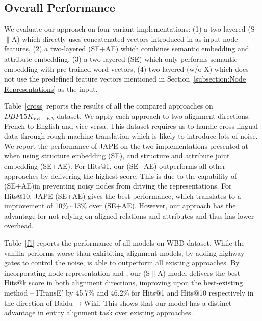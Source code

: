 \subsection{Overall Performance\label{overall}}
We evaluate our approach on four variant implementations: (1) a two-layered \HRGCN (S$\|$A) which directly uses concatenated vectors
introduced in  as input node features, (2) a two-layered \HRGCN (SE+AE) which combines semantic embedding and
attribute embedding, (3) a two-layered \HRGCN (SE) which only performs semantic embedding with pre-trained word vectors, (4) two-layered
\HRGCN (w/o X) which does not use the predefined feature vectors mentioned in Section~\ref{subsection:Node
		Representations} as the input.

 Table~\ref{cross} reports the results of all the compared approaches on $DBP15K_{FR-EN}$
dataset. We apply each approach
 to two alignment directions: French to English and vice versa. This dataset requires us to handle
cross-lingual data through rough machine translation which is likely to introduce lots of noise. We report the performance of JAPE on the
two implementations presented at
 ~\cite{sun2017cross} when using structure embedding (SE), and structure and attribute joint embedding (SE+AE).
For Hits@1, our \HRGCN (SE+AE) outperforms all other approaches by delivering the highest score. This is due to the capability of \HRGCN
(SE+AE)in preventing noisy nodes from driving the \KG representations. For Hits@10, JAPE (SE+AE) gives the best performance, which
translates to a improvement of 10\%$\sim$13\% over \HRGCN (SE+AE). However, our approach has the advantage for not relying on aligned
relations and attributes and thus has lower overhead.


 Table~\ref{f1} reports the performance of all models on WBD dataset. While the vanilla \GCN performs worse than
exhibiting alignment models, by adding highway gates to control the noise, \HGCN is able to outperform all existing approaches. By
incorporating node representation and \RGCN, our \HRGCN (S$\|$A) model delivers the best Hits@k score in both alignment directions,
improving upon the best-existing method -- ITransE$'$ by 45.7\% and 46.2\% for Hits@1 and Hits@10 respectively in the direction of
Baidu$\rightarrow$Wiki. This shows that our model has a distinct advantage in entity alignment task over existing approaches.










